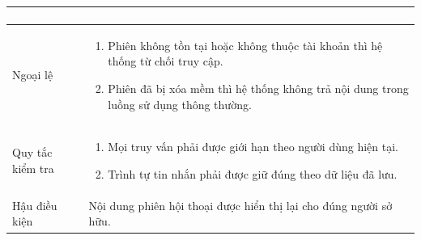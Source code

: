 \documentclass[12pt,a4paper,oneside]{report}
\begin{document}
{\begin{longtable}{|L{3.6cm}|L{11.2cm}|}
\begin{enumerate}[leftmargin=*,nosep]
                          \end{enumerate}                                                                       \\
    \hline
    Ngoại lệ            & \begin{enumerate}[leftmargin=*,nosep]
                            \item Phiên không tồn tại hoặc không thuộc tài khoản thì hệ thống từ chối truy cập.
                            \item Phiên đã bị xóa mềm thì hệ thống không trả nội dung trong luồng sử dụng thông thường.
                          \end{enumerate}                                                     \\
    \hline
    Quy tắc kiểm tra    & \begin{enumerate}[leftmargin=*,nosep]
                            \item Mọi truy vấn phải được giới hạn theo người dùng hiện tại.
                            \item Trình tự tin nhắn phải được giữ đúng theo dữ liệu đã lưu.
                          \end{enumerate}                                                                                 \\
    \hline
    Hậu điều kiện       & Nội dung phiên hội thoại được hiển thị lại cho đúng người sở hữu.                                                                              \\
    \hline
  \end{longtable}
}
\end{document}
